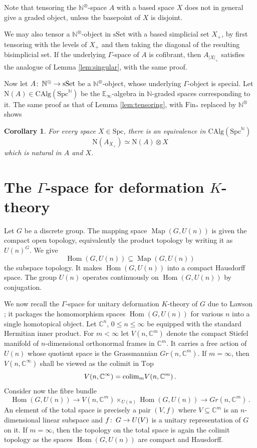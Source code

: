 \documentclass[oneside, a4paper, 12pt]{article}
\numberwithin{equation}{section}
\DeclareMathOperator{\Hom}{Hom}
\newcommand{\CAlg}{\mathrm{CAlg}}
\newcommand{\Spc}{\mathrm{Spc}}
\newcommand{\Topp}{\mathrm{Top}}
\newcommand{\Fin}{\mathrm{Fin}}
\newcommand{\sset}{\mathrm{sSet}}
\newcommand{\C}{\mathbb{C}}
\newcommand{\N}{\mathbb{N}}
\newcommand{\Map}{\operatorname{Map}}
\newcommand{\co}{\colon\thinspace}
\theoremstyle{plain}
\newtheorem{corollary}[theorem]{Corollary}
\theoremstyle{definition}
\theoremstyle{remark}
\begin{document}
Note that tensoring the $\N^\otimes$-space $A$ with a based space $X$ does not in general give a graded object, unless the basepoint of $X$ is disjoint.

We may also tensor a $\N^\otimes$-object in $\sset$ with a based simplicial set $X_+$, by first tensoring with the levels of $X_+$ and then taking the diagonal of the resulting bisimplicial set. If the underlying $\Gamma$-space of $A$ is cofibrant, then $A_{|X|_+}$ satisfies the analogue of Lemma \ref{lem:singular}, with the same proof.


Now let $A\co \N^\otimes\to \sset$ be a $\N^\otimes$-object, whose underlying $\Gamma$-object is special. Let $\mathrm{N}(A)\in \CAlg(\Spc^\N)$ be the $\mathbb{E}_\infty$-algebra in $\N$-graded spaces corresponding to it. The same proof as that of Lemma \ref{lem:tensoring}, with $\Fin_\ast$ replaced by $\N^\otimes$ shows

\begin{corollary} \label{cor:tensor2}
For every space $X\in \Spc$, there is an equivalence in $\CAlg(\Spc^\N)$
\[
\mathrm{N}(A_{X_+})\simeq \mathrm{N}(A)\otimes X
\]
which is natural in $A$ and $X$.
\end{corollary}





\section{The $\Gamma$-space for deformation $K$-theory} \label{sec:defktheory}

Let $G$ be a discrete group. The mapping space $\Map(G,U(n))$ is given the compact open topology, equivalently the product topology by writing it as $U(n)^G$. We give
\[
\Hom(G,U(n))\subseteq \Map(G,U(n))
\]
the subspace topology. It makes $\Hom(G,U(n))$ into a compact Hausdorff space. The group $U(n)$ operates continuously on $\Hom(G,U(n))$ by conjugation.

We now recall the $\Gamma$-space for unitary deformation $K$-theory of $G$ due to Lawson \cite{Lawson}; it packages the homomorphism spaces $\Hom(G,U(n))$ for various $n$ into a single homotopical object. Let $\C^n$, $0\leq n\leq \infty$ be equipped with the standard Hermitian inner product. For $m< \infty$ let $V(n,\C^m)$ denote the compact Stiefel manifold of $n$-dimensional orthonormal frames in $\C^m$. It carries a free action of $U(n)$ whose quotient space is the Grassmannian $Gr(n,\C^m)$. If $m=\infty$, then $V(n,\C^\infty)$ shall be viewed as the colimit in $\Topp$
\[
V(n,\C^\infty)=\textnormal{colim}_{m} V(n,\C^m)\, .
\]
Consider now the fibre bundle
\[
\Hom(G,U(n)) \to V(n,\C^m)\times_{U(n)} \Hom(G,U(n)) \to Gr(n,\C^m)\, .
\]
An element of the total space is precisely a pair $(V,f)$ where $V\subseteq\C^m$ is an $n$-dimensional linear subspace and $f\co G\to U(V)$ is a unitary representation of $G$ on it. If $m=\infty$, then the topology on the total space is again the colimit topology as the spaces $\Hom(G,U(n))$ are compact and Hausdorff.
\end{document}
